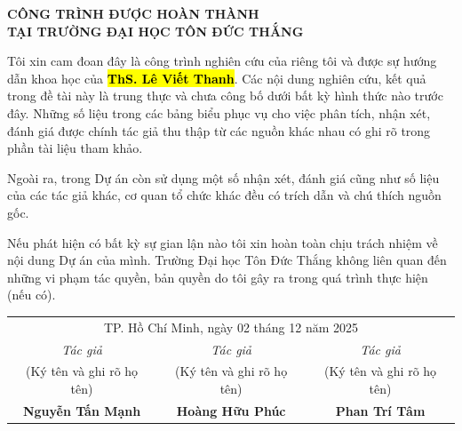 \begin{center}
\textbf{\Large CÔNG TRÌNH ĐƯỢC HOÀN THÀNH}\\
\vspace{0.5cm} %
\Large \textbf{TẠI TRƯỜNG ĐẠI HỌC TÔN ĐỨC THẮNG}
\end{center}


\vspace{1cm} %

Tôi xin cam đoan đây là công trình nghiên cứu của riêng tôi và được sự hướng dẫn khoa học của \hl{\textbf{ThS. Lê Viết Thanh}}. Các nội dung nghiên cứu, kết quả trong đề tài này là trung thực và chưa công bố dưới bất kỳ hình thức nào trước đây. Những số liệu trong các bảng biểu phục vụ cho việc phân tích, nhận xét, đánh giá được chính tác giả thu thập từ các nguồn khác nhau có ghi rõ trong phần tài liệu tham khảo.

Ngoài ra, trong Dự án còn sử dụng một số nhận xét, đánh giá cũng như số liệu của các tác giả khác, cơ quan tổ chức khác đều có trích dẫn và chú thích nguồn gốc.

Nếu phát hiện có bất kỳ sự gian lận nào tôi xin hoàn toàn chịu trách nhiệm về nội dung Dự án của mình. Trường Đại học Tôn Đức Thắng không liên quan đến những vi phạm tác quyền, bản quyền do tôi gây ra trong quá trình thực hiện (nếu có).

\vspace{2cm} %

\begin{center} %
    \begin{tabular}{c c c} %
        \multicolumn{3}{c}{TP. Hồ Chí Minh, ngày 02 tháng 12 năm 2025} \\[0.5cm] %
        
        \textit{Tác giả} & \textit{Tác giả} & \textit{Tác giả} \\
        (Ký tên và ghi rõ họ tên) & (Ký tên và ghi rõ họ tên) & (Ký tên và ghi rõ họ tên) \\[2.5cm] %
        
        \textbf{Nguyễn Tấn Mạnh}& \textbf{Hoàng Hữu Phúc} & \textbf{Phan Trí Tâm}
    \end{tabular}
\end{center}